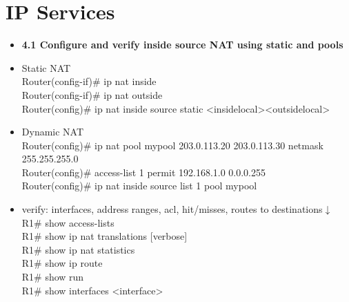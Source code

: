 \documentclass{article}
\begin{document}
\section{IP Services}
\begin{itemize}
  \item \textbf{4.1 Configure and verify inside source NAT using static and pools}
  	\item[] Static NAT\\
		Router(config-if)\# ip nat inside\\
		Router(config-if)\# ip nat outside\\
		Router(config)\# ip nat inside source static \textless inside\-local\textgreater \textless outside\-local\textgreater
	\item[] Dynamic NAT\\
		Router(config)\# ip nat pool mypool 203.0.113.20 203.0.113.30 netmask 255.255.255.0\\
		Router(config)\# access-list 1 permit 192.168.1.0 0.0.0.255\\
		Router(config)\# ip nat inside source list 1 pool mypool\\
	\item[] verify: interfaces, address ranges, acl, hit/misses, routes to destinations$\downarrow$\\
		R1\# show access-lists\\
		R1\# show ip nat translations [verbose]\\
		R1\# show ip nat statistics\\
		R1\# show ip route\\
		R1\# show run\\
		R1\# show interfaces \textless interface\textgreater
		

\end{itemize}
\end{document}
